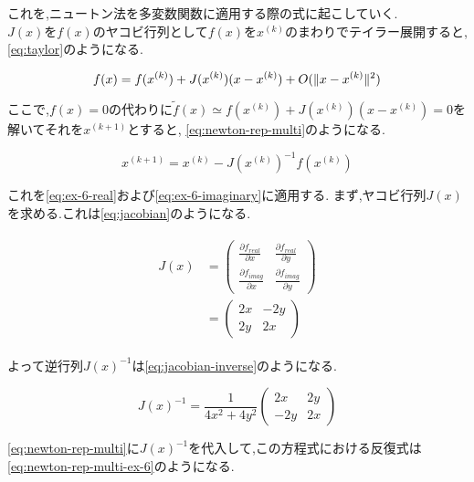 \documentclass[autodetect-engine, dvi=dvipdfmx, 10pt, a4paper, ja=standard]{bxjsarticle}
\begin{document}
これを,ニュートン法を多変数関数に適用する際の式に起こしていく.
$J(x)をf(x)のヤコビ行列としてf(x)をx^{(k)}$のまわりでテイラー展開すると,\ref{eq:taylor}のようになる.

\begin{equation}
	\label{eq:taylor}
	f(x)          = f(x^{(k)}) + J(x^{(k)})(x - x^{(k)}) + O(\|x - x^{(k)}\|^2) \\
\end{equation}

ここで,$f(x) = 0$の代わりに$\tilde{f}(x) \simeq f(x^{(k)}) + J(x^{(k)})(x - x^{(k)}) = 0$を解いてそれを$x^{(k+1)}$とすると,
\ref{eq:newton-rep-multi}のようになる.

\begin{equation}
	\label{eq:newton-rep-multi}
	x^{(k+1)} = x^{(k)} - J(x^{(k)})^{-1}f(x^{(k)})
\end{equation}

これを\ref{eq:ex-6-real}および\ref{eq:ex-6-imaginary}に適用する.
まず,ヤコビ行列$J(x)$を求める.これは\ref{eq:jacobian}のようになる.

\begin{align}
	\begin{split}
		\label{eq:jacobian}
		J(x) & = \begin{pmatrix}
			         \frac{\partial f_{real}}{\partial x} & \frac{\partial f_{real}}{\partial y} \\
			         \frac{\partial f_{imag}}{\partial x} & \frac{\partial f_{imag}}{\partial y}
		         \end{pmatrix}
		\\
		     & = \begin{pmatrix}
			         2x & -2y \\
			         2y & 2x
		         \end{pmatrix}
	\end{split}
\end{align}

よって逆行列$J(x)^{-1}$は\ref{eq:jacobian-inverse}のようになる.

\begin{equation}
	\label{eq:jacobian-inverse}
	J(x)^{-1} = \frac{1}{4x^2 + 4y^2} \begin{pmatrix}
		2x  & 2y \\
		-2y & 2x
	\end{pmatrix}
\end{equation}

\ref{eq:newton-rep-multi}に$J(x)^{-1}$を代入して,この方程式における反復式は\ref{eq:newton-rep-multi-ex-6}のようになる.
\end{document}
